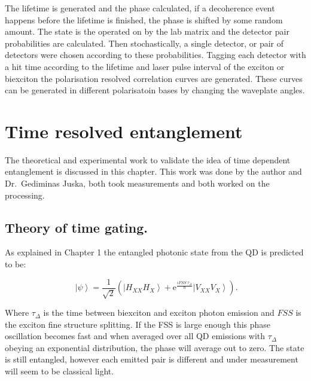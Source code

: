 \documentclass[12pt, twoside]{article}
\numberwithin{equation}{section}
\begin{document}
The lifetime is generated and the phase calculated, if a decoherence
event happens before the lifetime is finished, the phase is shifted by
some random amount. The state is the operated on by the lab matrix and
the detector pair probabilities are calculated. Then stochastically, a
single detector, or pair of detectors were chosen according to these
probabilities. Tagging each detector with a hit time according to the
lifetime and laser pulse interval of the exciton or biexciton the
polarisation resolved correlation curves are generated. These curves can
be generated in different polarisatoin bases by changing the waveplate
angles.

\newpage
\section{Time resolved entanglement}

The theoretical and experimental work to validate the idea of time
dependent entanglement is discussed in this chapter. This work was done
by the author and Dr.~Gediminas Juska, both took measurements and both
worked on the processing.

\subsection{Theory of time gating.}\label{theory-of-time-gating.}

As explained in Chapter 1 the entangled photonic state from the QD is
predicted to be\cite{entangletime}:

\begin{equation}
\ \left|\psi\right\rangle = \frac{1}{\sqrt{2}} 
\left(\left|H_{XX} H_X\right\rangle + \mathrm e ^{\frac{i FSS \ \tau_\Delta}{\hbar}}\left|V_{XX} V_X\right\rangle \right).
\end{equation}

Where $\tau_\Delta$ is the time between biexciton and exciton photon
emission and $FSS$ is the exciton fine structure splitting. If the FSS
is large enough this phase oscillation becomes fast and when averaged
over all QD emissions with $\tau_\Delta$ obeying an exponential
distribution, the phase will average out to zero. The state is still
entangled, however each emitted pair is different and under measurement
will seem to be classical light.
\end{document}
